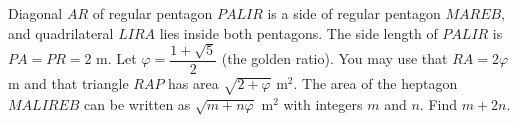 Diagonal $AR$ of regular pentagon $PALIR$ is a side of regular pentagon $MAREB$, and quadrilateral $LIRA$ lies inside both pentagons. The side length of $PALIR$ is $PA=PR=2$ m. Let $\varphi=\dfrac{1+\sqrt5}{2}$ (the golden ratio). You may use that $RA=2\varphi$ m and that triangle $RAP$ has area $\sqrt{2+\varphi}$ m$^2$. The area of the heptagon $MALIREB$ can be written as $\sqrt{m+n\varphi}$ m$^2$ with integers $m$ and $n$. Find $m+2n$.
